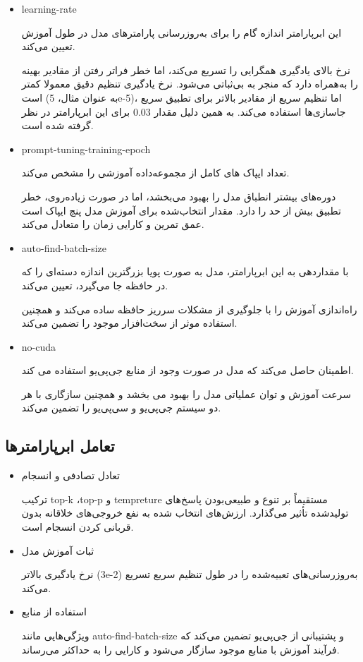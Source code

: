 \begin{itemize}
\item
learning-rate


این ابرپارامتر اندازه گام را برای به‌روزرسانی پارامترهای مدل در طول آموزش تعیین می‌کند.

 نرخ بالای یادگیری همگرایی را تسریع می‌کند، اما خطر فراتر رفتن از مقادیر بهینه را به‌همراه دارد که منجر به بی‌ثباتی می‌شود.  نرخ یادگیری تنظیم دقیق معمولا کمتر است (به عنوان مثال، 5e-5)، اما تنظیم سریع از مقادیر بالاتر برای تطبیق سریع جاسازی‌ها استفاده می‌کند. به همین دلیل مقدار 
\num{0.03}
 برای این ابرپارامتر در نظر گرفته شده است.
\item
 prompt-tuning-training-epoch

تعداد ایپاک%
‌ها‌ی کامل از مجموعه‌داده آموزشی را مشخص می‌کند.

دوره‌های بیشتر انطباق مدل را بهبود می‌بخشد، اما در صورت زیاده‌روی، خطر 
تطبیق بیش از حد%
 را دارد. مقدار انتخاب‌شده برای آموزش مدل پنچ ایپاک است عمق تمرین و کارایی زمان را متعادل می‌کند.

\item
 auto-find-batch-size

 با مقداردهی به این ابرپارامتر، مدل به صورت پویا بزرگترین اندازه دسته‌ای را که در حافظه جا می‌گیرد، تعیین می‌کند.

 راه‌اندازی آموزش را با جلوگیری از مشکلات سرریز حافظه ساده می‌کند و همچنین استفاده موثر از سخت‌افزار موجود را تضمین می‌کند.
\item
 no-cuda

اطمینان حاصل می‌کند که مدل در صورت وجود از منابع جی‌پی‌یو استفاده می کند.

 سرعت آموزش و توان عملیاتی مدل را بهبود می بخشد و همچنین سازگاری با هر دو سیستم جی‌پی‌یو و سی‌پی‌یو را تضمین می‌کند.
\end{itemize}

\subsection{تعامل ابرپارامترها}
\begin{itemize}
\item
 تعادل تصادفی و انسجام

 ترکیب top-k ،top-p و tempreture مستقیماً بر تنوع و طبیعی‌بودن پاسخ‌های تولید‌شده تأثیر می‌گذارد. ارزش‌های انتخاب شده به نفع خروجی‌های خلاقانه بدون قربانی کردن انسجام است.
\item
 ثبات آموزش مدل

 نرخ یادگیری بالاتر (3e-2) به‌روزرسانی‌های تعبیه‌شده را در طول تنظیم سریع تسریع می‌کند.
\item
 استفاده از منابع

 ویژگی‌هایی مانند auto-find-batch-size و پشتیبانی از جی‌پی‌یو تضمین می‌کند که فرآیند آموزش با منابع موجود سازگار می‌شود و کارایی را به حداکثر می‌رساند.
\end{itemize}

